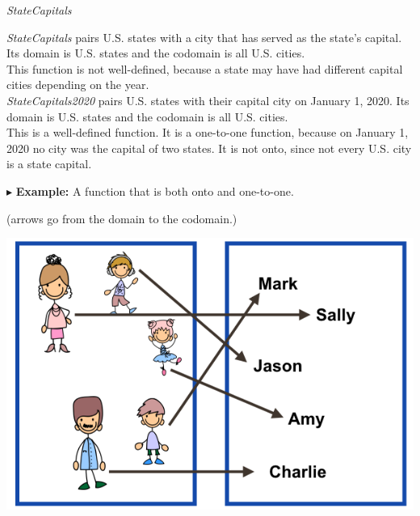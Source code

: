 \documentclass{ximera}
\begin{document}
\begin{example} \textit{StateCapitals}


\textit{StateCapitals} pairs U.S. states with a city that has served as the state's capital. Its domain is U.S. states and the codomain is all U.S. cities.\\



This function is not well-defined, because a state may have had different capital cities depending on the year. \\


\textit{StateCapitals2020} pairs U.S. states with their capital city on January 1, 2020. Its domain is U.S. states and the codomain is all U.S. cities.\\


This is a well-defined function.  It is a one-to-one function, because on January 1, 2020 no city was the capital of two states.  It is not onto, since not every U.S. city is a state capital.


\end{example}












$\blacktriangleright$ \textbf{Example:} A function that is both onto and one-to-one.  \\

\begin{center}
(arrows go from the domain to the codomain.)
\begin{image}
\includegraphics{pics/ontoandonetoone.png}
\end{image}
\end{center}
\end{document}
